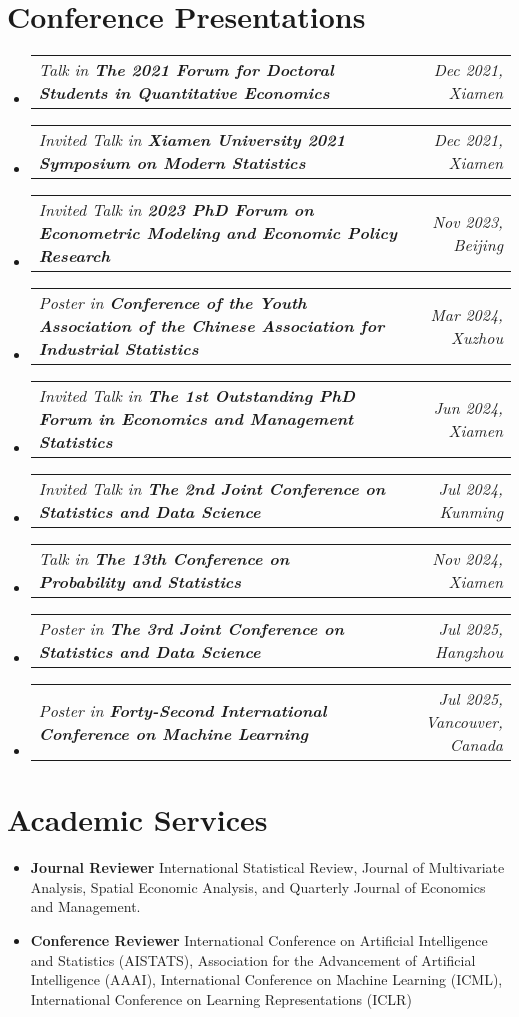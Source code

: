 \documentclass[letterpaper,10pt]{article}
\makeatletter
\newcommand{\resumeSubSubheading}[2]{
    \item
    \begin{tabular*}{0.97\textwidth}{l@{\extracolsep{\fill}}r}
      \textit{\small#1} & \textit{\small #2} \\
    \end{tabular*}\vspace{-7pt}
}
\newcommand{\resumeSubHeadingListStart}{\begin{itemize}[leftmargin=0.15in, label={}]}
\newcommand{\resumeSubHeadingListEnd}{\end{itemize}}
\makeatother
\begin{document}
\section{Conference Presentations}
\resumeSubHeadingListStart
    \resumeSubSubheading
        {Talk in \textbf{The 2021 Forum for Doctoral Students in Quantitative Economics}}{Dec 2021, Xiamen}
    \resumeSubSubheading
        {Invited Talk in \textbf{Xiamen University 2021 Symposium on Modern Statistics}}{Dec 2021, Xiamen}
    \resumeSubSubheading
        {Invited Talk in \textbf{2023 PhD Forum on Econometric Modeling and Economic Policy Research}}{Nov 2023, Beijing}
    \resumeSubSubheading
        {Poster in \textbf{Conference of the Youth Association of the Chinese Association for Industrial Statistics}}{Mar 2024, Xuzhou}
    \resumeSubSubheading
        {Invited Talk in \textbf{The 1st Outstanding PhD Forum in Economics and Management Statistics}}{Jun 2024, Xiamen}
    \resumeSubSubheading
        {Invited Talk in \textbf{The 2nd Joint Conference on Statistics and Data Science}}{Jul 2024, Kunming}
    \resumeSubSubheading
        {Talk in \textbf{The 13th Conference on Probability and Statistics}}{Nov 2024, Xiamen}
    \resumeSubSubheading
        {Poster in \textbf{The 3rd Joint Conference on Statistics and Data Science}}{Jul 2025, Hangzhou}
    \resumeSubSubheading
        {Poster in \textbf{Forty-Second International Conference on Machine Learning}}{Jul 2025, Vancouver, Canada}
\resumeSubHeadingListEnd


\section{Academic Services}
\begin{itemize}[leftmargin=0.15in, label={}]
   \item \textbf{Journal Reviewer} 
 {International Statistical Review}, {Journal of Multivariate Analysis}, {Spatial Economic Analysis}, and {Quarterly Journal of Economics and Management}.\\
  \item \textbf{Conference Reviewer} 
 {International Conference on Artificial Intelligence and Statistics (AISTATS), Association for the Advancement of Artificial Intelligence (AAAI), International Conference on Machine Learning (ICML), International Conference on Learning Representations (ICLR)}
\end{itemize}
\end{document}
